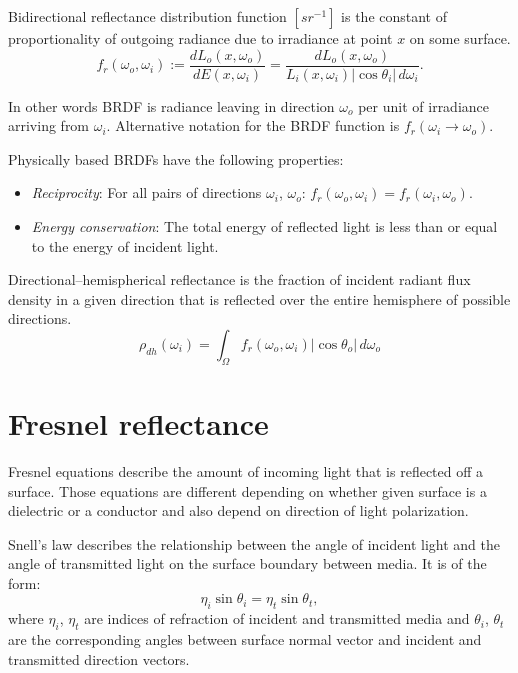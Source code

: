 \begin{df}[BRDF]
Bidirectional reflectance distribution function $[sr^{-1}]$ is the constant of proportionality of outgoing radiance due to irradiance at point $x$ on some surface.
\begin{equation}
  f_{r}(\omega_{o}, \omega_{i}) := \frac{dL_{o}(x, \omega_{o})}{dE(x, \omega_{i})} = \frac{dL_{o}(x, \omega_{o})}{L_{i}(x, \omega_{i}) |\cos\theta_{i}| \,d\omega_{i}}.
\end{equation}
\end{df}

In other words BRDF is radiance leaving in direction $\omega_{o}$ per unit of irradiance arriving from $\omega_{i}$. Alternative notation for the BRDF function is $f_{r}(\omega_{i} \rightarrow \omega_{o})$.

Physically based BRDFs have the following properties:
\begin{itemize}
\item \emph{Reciprocity}: For all pairs of directions $\omega_{i}$, $\omega_{o}$: $f_{r}(\omega_{o}, \omega_{i}) = f_{r}(\omega_{i}, \omega_{o})$.
\item \emph{Energy conservation}: The total energy of reflected light is less than or equal to the energy of incident light.
\end{itemize}

\begin{df}
Directional--hemispherical reflectance \parencite{sillion94} is the fraction of incident radiant flux density in a given direction that is reflected over the entire hemisphere of possible directions.
\begin{equation}
\label{eq:dhrefl}
  \rho_{dh}(\omega_{i}) = \int_{\Omega} f_{r}(\omega_{o}, \omega_{i}) |\cos\theta_{o}| \,d\omega_{o}
\end{equation}
\end{df}

\section{Fresnel reflectance}
Fresnel equations describe the amount of incoming light that is reflected off a surface. Those equations are different depending on whether given surface is a dielectric or a conductor and also depend on direction of light polarization.

\begin{df}
Snell's law describes the relationship between the angle of incident light and the angle of transmitted light on the surface boundary between media. It is of the form:
\begin{equation}
  \eta_{i} \sin\theta_{i} = \eta_{t} \sin\theta_{t},
\end{equation}
where $\eta_{i}$, $\eta_{t}$ are indices of refraction of incident and transmitted media and $\theta_{i}$, $\theta_{t}$ are the corresponding angles between surface normal vector and incident and transmitted direction vectors.
\end{df}

